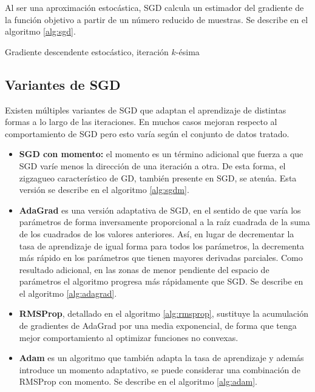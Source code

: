 Al ser una aproximación estocástica, SGD calcula un estimador del
gradiente de la función objetivo a partir de un número reducido de
muestras. Se describe en el algoritmo \ref{alg:sgd}.

\begin{algorithm}
\caption{Gradiente descendente estocástico, iteración $k$-ésima}
\label{alg:sgd}
\begin{algorithmic}
  \ENDWHILE
\end{algorithmic}
\end{algorithm}

\subsection{Variantes de SGD}\label{variantes-de-sgd}

Existen múltiples variantes de SGD que adaptan el aprendizaje de distintas formas a lo largo de las iteraciones. En muchos casos mejoran respecto al comportamiento de SGD pero esto varía según el conjunto de datos tratado.

\begin{itemize}
\item \textbf{SGD con momento:} el momento es un término adicional que fuerza a que SGD varíe menos la
dirección de una iteración a otra. De esta forma, el zigzagueo
característico de GD, también presente en SGD, se atenúa. Esta versión
se describe en el algoritmo \ref{alg:sgdm}.
\item \textbf{AdaGrad} \autocite{adagrad} es una versión adaptativa de SGD, en el
sentido de que varía los parámetros de forma inversamente proporcional a
la raíz cuadrada de la suma de los cuadrados de los valores anteriores.
Así, en lugar de decrementar la tasa de aprendizaje de igual forma para
todos los parámetros, la decrementa más rápido en los parámetros que
tienen mayores derivadas parciales. Como resultado adicional, en las
zonas de menor pendiente del espacio de parámetros el algoritmo progresa
más rápidamente que SGD. Se describe en el algoritmo \ref{alg:adagrad}.
\item \textbf{RMSProp}, detallado en el algoritmo \ref{alg:rmsprop},
sustituye la acumulación de gradientes de AdaGrad por una media
exponencial, de forma que tenga mejor comportamiento al optimizar
funciones no convexas.
\item \textbf{Adam} es un algoritmo que también adapta la tasa de aprendizaje y además
introduce un momento adaptativo, se puede considerar una combinación de
RMSProp con momento. Se describe en el algoritmo \ref{alg:adam}.

\end{itemize}

